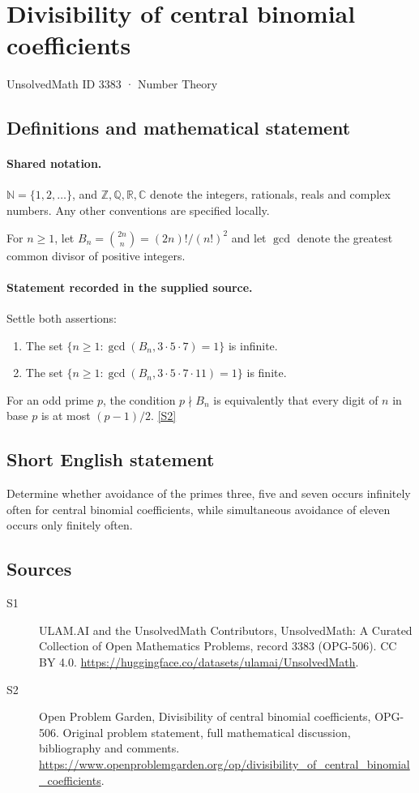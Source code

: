 \documentclass[11pt]{article}
\newcommand{\sref}[2]{\hyperlink{source:#1:#2}{[S#2]}}
\begin{document}
\setcounter{section}{3382}
\section{Divisibility of central binomial coefficients}\label{3383}
{\small\sffamily UnsolvedMath ID 3383 · Number Theory}
\subsection{Definitions and mathematical statement}

\paragraph{Shared notation.}$\mathbb N=\{1,2,\ldots\}$, and $\mathbb Z,\mathbb Q,\mathbb R,\mathbb C$ denote the integers, rationals, reals and complex numbers. Any other conventions are specified locally.


For $n\ge1$, let $B_n=\binom{2n}{n}=(2n)!/(n!)^2$ and let $\gcd$ denote the greatest common divisor of positive integers.
\paragraph{Statement recorded in the supplied source.}
Settle both assertions:
\begin{enumerate}
\item The set $\{n\ge1:\gcd(B_n,3\cdot5\cdot7)=1\}$ is infinite.
\item The set $\{n\ge1:\gcd(B_n,3\cdot5\cdot7\cdot11)=1\}$ is finite.
\end{enumerate}
For an odd prime $p$, the condition $p\nmid B_n$ is equivalently that every digit of $n$ in base $p$ is at most $(p-1)/2$. \sref{3383}{2}
\subsection{Short English statement}
Determine whether avoidance of the primes three, five and seven occurs infinitely often for central binomial coefficients, while simultaneous avoidance of eleven occurs only finitely often.
\subsection{Sources}
\begin{description}
\item[\hypertarget{source:3383:1}{S1}] ULAM.AI and the UnsolvedMath Contributors, UnsolvedMath: A Curated Collection of Open Mathematics Problems, record 3383 (OPG-506). CC BY 4.0. \url{https://huggingface.co/datasets/ulamai/UnsolvedMath}.
\item[\hypertarget{source:3383:2}{S2}] Open Problem Garden, Divisibility of central binomial coefficients, OPG-506. Original problem statement, full mathematical discussion, bibliography and comments. \url{https://www.openproblemgarden.org/op/divisibility_of_central_binomial_coefficients}.
\end{description}
\label{end:3383}
\end{document}
